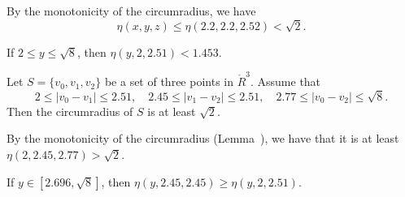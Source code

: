 \begin{tarskidata}
\begin{tarski}
\begin{proved}
By the monotonicity of the circumradius, we have
	$$\eta(x,y,z)\le \eta(2.2,2.2,2.52) < \sqrt2.$$
\swallowed\end{proved}
\end{tarski}



\begin{tarski}

\begin{lemma}
If $2\le y\le\sqrt8$, then $\eta(y,2,2.51) < 1.453$.
\end{lemma}

\begin{proved}
\swallowed\end{proved}
\end{tarski}



\begin{tarski}

\begin{lemma}
Let $S=\{v_0,v_1,v_2\}$ be a set of three points in $\ring{R}^3$.
Assume that 
  $$
  2\le|v_0-v_1|\le 2.51,\quad 2.45\le|v_1-v_2|\le 2.51,
  \quad 2.77\le |v_0-v_2|\le \sqrt8.
  $$
Then the circumradius of $S$ is at least $\sqrt2$.
\end{lemma}


\begin{proved}
By the monotonicity of the circumradius (Lemma~), 
we have
that it is at least $\eta(2,2.45,2.77) > \sqrt2$.
\swallowed\end{proved}
\end{tarski}





\begin{tarski}

\begin{lemma}
If $y\in[2.696,\sqrt8]$, then
$\eta(y,2.45,2.45)\ge\eta(y,2,2.51)$.
\end{lemma}


\end{tarski}
\end{tarskidata}

